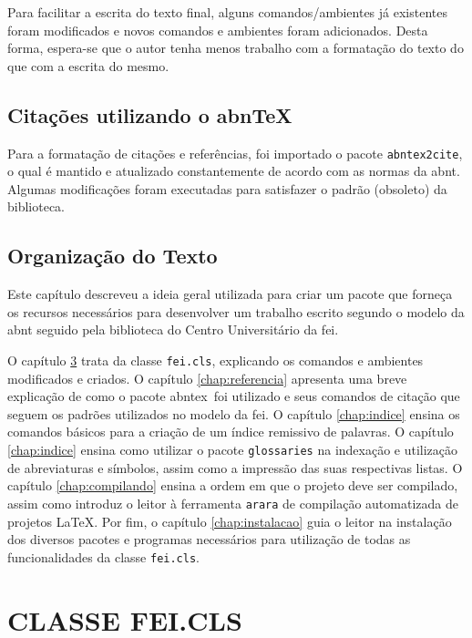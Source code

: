 \documentclass{fei}
\begin{document}
Para facilitar a escrita do texto final, alguns comandos/ambientes já existentes foram modificados e novos comandos e ambientes foram adicionados. Desta forma, espera-se que o autor tenha menos trabalho com a formatação do texto do que com a escrita do mesmo.

\section{Citações utilizando o abn\TeX}

Para a formatação de citações e referências, foi importado o pacote \verb+abntex2cite+, o qual é mantido e atualizado constantemente de acordo com as normas da \gls{abnt}. Algumas modificações foram executadas para satisfazer o padrão (obsoleto) da biblioteca.

\section{Organização do Texto}

Este capítulo descreveu a ideia geral utilizada para criar um pacote que forneça os recursos necessários para desenvolver um trabalho escrito segundo o modelo da \gls{abnt} seguido pela biblioteca do Centro Universitário da \gls{fei}.

O capítulo \ref{chap:classe} trata da classe \texttt{fei.cls}, explicando os comandos e ambientes modificados e criados. O capítulo \ref{chap:referencia} apresenta uma breve explicação de como o pacote \gls{abntex}~foi utilizado e seus comandos de citação que seguem os padrões utilizados no modelo da \gls{fei}. O capítulo \ref{chap:indice} ensina os comandos básicos para a criação de um índice remissivo de palavras. O capítulo \ref{chap:indice} ensina como utilizar o pacote \verb+glossaries+ na indexação e utilização de abreviaturas e símbolos, assim como a impressão das suas respectivas listas. O capítulo \ref{chap:compilando} ensina a ordem em que o projeto deve ser compilado, assim como introduz o leitor à ferramenta \verb+arara+ de compilação automatizada de projetos \LaTeX. Por fim, o capítulo \ref{chap:instalacao} guia o leitor na instalação dos diversos pacotes e programas necessários para utilização de todas as funcionalidades da classe \texttt{fei.cls}.

\chapter{CLASSE FEI.CLS}\label{chap:classe}
\end{document}
